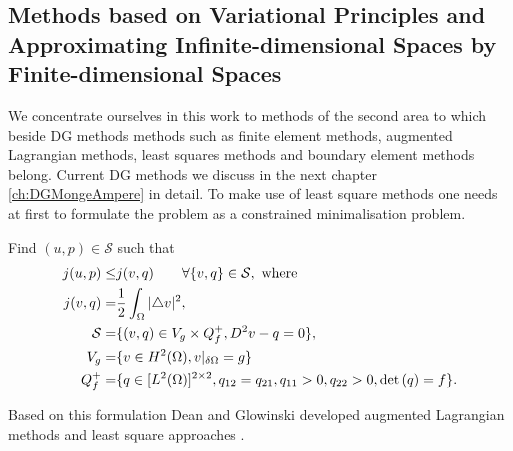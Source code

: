\subsection{Methods based on Variational Principles and Approximating Infinite-dimensional Spaces by Finite-dimensional Spaces}
 We concentrate ourselves in this work to methods of the second area to which beside DG methods methods such as finite element methods, augmented Lagrangian methods, least squares methods and boundary element methods belong. Current DG methods we discuss in the next chapter \ref{ch:DGMongeAmpere} in detail.
To make use of least square methods one needs at first to formulate the \MA problem as a constrained minimalisation problem.
\begin{definition}
Find $(u,p) \in \mathcal{S}$ such that
\begin{align}
	j(u,p) \leq& j(v,q) \qquad \forall \{v,q\} \in \mathcal{S}, \text{ where }\\
	j(v,q)  =& \frac 1 2 \int_{\Omega} |\triangle v |^2, \\
	\mathcal{S} =& \{(v,q)\in V_g \times Q^+_f, D^2v-q =0\},\\
	V_g =& \{v \in H^2(\Omega), v \arrowvert_{\delta \Omega}=g\} \\
	Q^+_f =& \{q \in [L^2(\Omega)]^{2\times2} , q_{12} =q_{21},  q_{11} > 0,q_{22} > 0, \det{\left(q\right)} = f\}.
\end{align}

\end{definition}
Based on this formulation Dean and Glowinski developed augmented Lagrangian methods and least square approaches \cite{DG2004,DG2006,DG2006a}.

